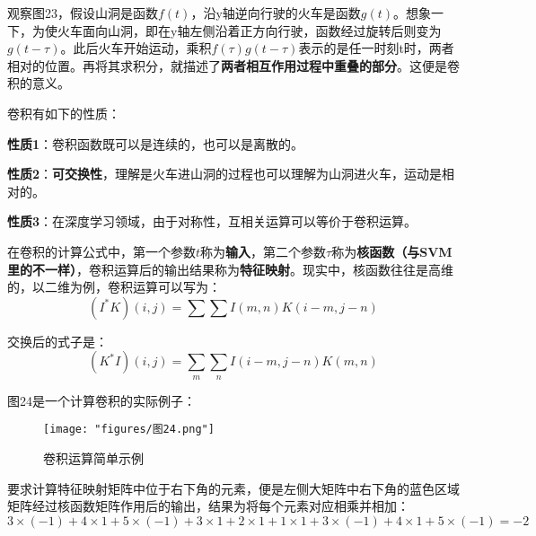 观察图23，假设山洞是函数$f(t)$，沿y轴逆向行驶的火车是函数$g(t)$。想象一下，为使火车面向山洞，即在y轴左侧沿着正方向行驶，函数经过旋转后则变为$g(t-\tau)$。此后火车开始运动，乘积$f(\tau) g(t-\tau)$表示的是任一时刻t时，两者相对的位置。再将其求积分，就描述了\textbf{两者相互作用过程中重叠的部分}。这便是卷积的意义。

卷积有如下的性质：

\textbf{性质1}：卷积函数既可以是连续的，也可以是离散的。

\textbf{性质2}：\textbf{可交换性}，理解是火车进山洞的过程也可以理解为山洞进火车，运动是相对的。

\textbf{性质3}：在深度学习领域，由于对称性，互相关运算可以等价于卷积运算。

在卷积的计算公式中，第一个参数$t$称为\textbf{输入}，第二个参数$\tau $称为\textbf{核函数（与SVM里的不一样）}，卷积运算后的输出结果称为\textbf{特征映射}。现实中，核函数往往是高维的，以二维为例，卷积运算可以写为：
\begin{equation}\left(I^*K\right)\left(i,j\right)=\sum\sum I\left(m,n\right)K\left(i-m,j-n\right)\end{equation}

交换后的式子是：
\begin{equation}\left(K^*I\right)\left(i,j\right)=\sum_m\sum_nI\left(i-m,j-n\right)K\left(m,n\right)\end{equation}

图24是一个计算卷积的实际例子：
\begin{figure}[ht] %
	\centering
	\texttt{[image: "figures/图24.png"]} %
	\caption{卷积运算简单示例} %
	\label{fig:example} %
\end{figure}

要求计算特征映射矩阵中位于右下角的元素，便是左侧大矩阵中右下角的蓝色区域矩阵经过核函数矩阵作用后的输出，结果为将每个元素对应相乘并相加：
\begin{equation}3\times(-1)+4\times1+5\times(-1)+3\times1+2\times1+1\times1+3\times(-1)+4\times1+5\times(-1)=-2\end{equation}


